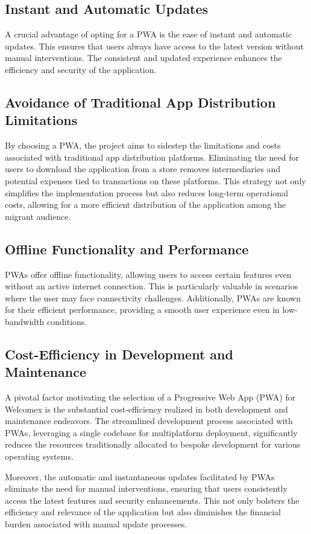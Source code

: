 \documentclass[conference]{IEEEtran}
\begin{document}
\subsection{Instant and Automatic Updates}
A crucial advantage of opting for a PWA is the ease of instant and automatic updates. This ensures that users always have access to the latest version without manual interventions. The consistent and updated experience enhances the efficiency and security of the application.
\subsection{Avoidance of Traditional App Distribution Limitations}
By choosing a PWA, the project aims to sidestep the limitations and costs associated with traditional app distribution platforms. Eliminating the need for users to download the application from a store removes intermediaries and potential expenses tied to transactions on these platforms. This strategy not only simplifies the implementation process but also reduces long-term operational costs, allowing for a more efficient distribution of the application among the migrant audience.
\subsection{Offline Functionality and Performance}
PWAs offer offline functionality, allowing users to access certain features even without an active internet connection. This is particularly valuable in scenarios where the user may face connectivity challenges. Additionally, PWAs are known for their efficient performance, providing a smooth user experience even in low-bandwidth conditions.
\subsection{Cost-Efficiency in Development and Maintenance}
A pivotal factor motivating the selection of a Progressive Web App (PWA) for Welcomex is the substantial cost-efficiency realized in both development and maintenance endeavors. The streamlined development process associated with PWAs, leveraging a single codebase for multiplatform deployment, significantly reduces the resources traditionally allocated to bespoke development for various operating systems.

Moreover, the automatic and instantaneous updates facilitated by PWAs eliminate the need for manual interventions, ensuring that users consistently access the latest features and security enhancements. This not only bolsters the efficiency and relevance of the application but also diminishes the financial burden associated with manual update processes.
\end{document}
